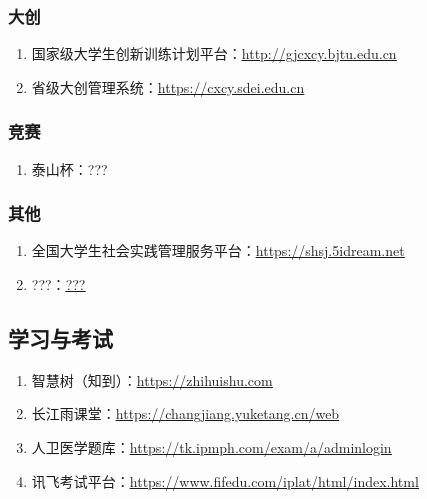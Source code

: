 \subsubsection[大创]{大创}
\begin{enumerate}
    \item 国家级大学生创新训练计划平台：\uline{\href{http://gjcxcy.bjtu.edu.cn}{http://gjcxcy.bjtu.edu.cn}}
    \item 省级大创管理系统：\uline{\href{https://cxcy.sdei.edu.cn}{https://cxcy.sdei.edu.cn}}
\end{enumerate}
\subsubsection[竞赛]{竞赛}
\begin{enumerate}
    \item 泰山杯：???
\end{enumerate}
\subsubsection[其他]{其他}
\begin{enumerate}
    \item 全国大学生社会实践管理服务平台：\uline{\href{https://shsj.5idream.net}{https://shsj.5idream.net}}
    \item ???：\uline{\href{???}{???}}
\end{enumerate}

\subsection[学习与考试]{学习与考试}
\begin{enumerate}
    \item 智慧树（知到）：\uline{\href{https://zhihuishu.com}{https://zhihuishu.com}}
    \item 长江雨课堂：\uline{\href{https://changjiang.yuketang.cn/web}{https://changjiang.yuketang.cn/web}}
    \item 人卫医学题库：\uline{\href{https://tk.ipmph.com/exam/a/adminlogin}{https://tk.ipmph.com/exam/a/adminlogin}}
    \item 讯飞考试平台：\uline{\href{https://www.fifedu.com/iplat/html/index.html}{https://www.fifedu.com/iplat/html/index.html}}
\end{enumerate}

